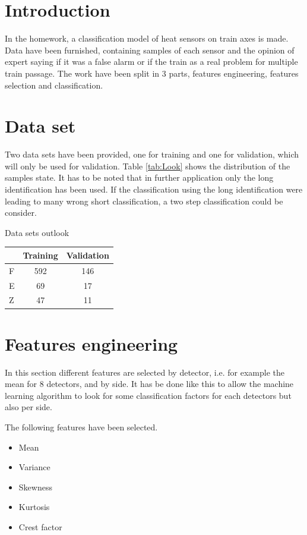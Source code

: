 \section{Introduction}
In the homework, a classification model of heat sensors on train axes is made. Data have been furnished, containing samples of each sensor and the opinion of expert saying if it was a false alarm or if the train as a real problem for multiple train passage. The work have been split in 3 parts, features engineering, features selection and classification. 

\vspace{-10mm}

\section{Data set}
Two data sets have been provided, one for training and one for validation, which will only be used for validation. Table \ref{tab:Look} shows the distribution of the samples state. It has to be noted that in further application only the long identification has been used. If the classification using the long identification were leading to many wrong short classification, a two step classification could be consider. 

{Data sets outlook}
{\label{tab:Look}} 
{\begin{tabular}{l|c|c|}
& Training & Validation \\\hline
F & 592 & 146 \\
E & 69 & 17 \\
Z & 47 & 11 \\
\end{tabular}}
{}

\section{Features engineering}
In this section different features are selected by detector, i.e. for example the mean for 8 detectors, and by side. It has be done like this to allow the machine learning algorithm to look for some classification factors for each detectors but also per side.

The following features have been selected. 

\begin{itemize}
    \item Mean
    \item Variance
    \item Skewness
    \item Kurtosis
    \item Crest factor
\end{itemize}

